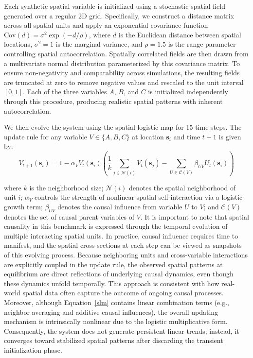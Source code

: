 \documentclass[authoryear,preprint,review,12pt]{elsarticle}
\begin{document}
Each synthetic spatial variable is initialized using a stochastic spatial field generated over a regular 2D grid. Specifically, we construct a distance matrix across all spatial units and apply an exponential covariance function \(\text{Cov}(d) = \sigma^2 \exp(-d / \rho)\), where \(d\) is the Euclidean distance between spatial locations, \(\sigma^2 = 1\) is the marginal variance, and \(\rho = 1.5\) is the range parameter controlling spatial autocorrelation. Spatially correlated fields are then drawn from a multivariate normal distribution parameterized by this covariance matrix. To ensure non-negativity and comparability across simulations, the resulting fields are truncated at zero to remove negative values and rescaled to the unit interval \([0,1]\). Each of the three variables \(A\), \(B\), and \(C\) is initialized independently through this procedure, producing realistic spatial patterns with inherent autocorrelation.

We then evolve the system using the spatial logistic map for 15 time steps. The update rule for any variable \(V \in \{A, B, C\}\) at location \(\mathbf{s}_i\) and time \(t+1\) is given by:
\begin{equation}\label{slm}
V_{t+1}(\mathbf{s}_i) = 1 - \alpha_V V_t(\mathbf{s}_i)\left(\frac{1}{k}\sum_{j\in \mathcal{N}(i)} V_t(\mathbf{s}_j) - \sum_{U\in \mathcal{C}(V)}\beta_{UV} U_t(\mathbf{s}_i)\right)
\end{equation}

\noindent where \(k\) is the neighborhood size; \(\mathcal{N}(i)\) denotes the spatial neighborhood of unit \(i\); \(\alpha_V\) controls the strength of nonlinear spatial self-interaction via a logistic growth term; \(\beta_{UV}\) denotes the causal influence from variable \(U\) to \(V\); and \(\mathcal{C}(V)\) denotes the set of causal parent variables of \(V\). It is important to note that spatial causality in this benchmark is expressed through the temporal evolution of multiple interacting spatial units. In practice, causal influence requires time to manifest, and the spatial cross-sections at each step can be viewed as snapshots of this evolving process. Because neighboring units and cross-variable interactions are explicitly coupled in the update rule, the observed spatial patterns at equilibrium are direct reflections of underlying causal dynamics, even though these dynamics unfold temporally. This approach is consistent with how real-world spatial data often capture the outcome of ongoing causal processes. Moreover, although Equation~\ref{slm} contains linear combination terms (e.g., neighbor averaging and additive causal influences), the overall updating mechanism is intrinsically nonlinear due to the logistic multiplicative form. Consequently, the system does not generate persistent linear trends; instead, it converges toward stabilized spatial patterns after discarding the transient initialization phase.
\end{document}
